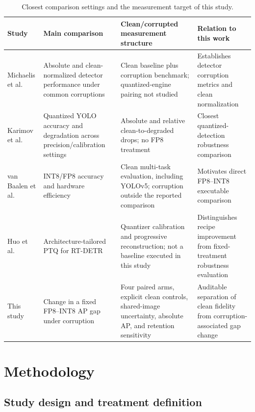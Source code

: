 \documentclass[a4paper,fleqn]{cas-dc}
\begin{document}
\begin{table}[t]
\centering\small
\caption{Closest comparison settings and the measurement target of this study.}
\label{tab:prior-art}
\setlength{\tabcolsep}{4pt}
\renewcommand{\arraystretch}{1.16}
\begin{tabular}{Y{2.3cm}Y{4.0cm}Y{4.0cm}Y{3.9cm}}
\toprule
Study & Main comparison & Clean/corrupted measurement structure & Relation to this work\\
\midrule
Michaelis et al.~\citep{michaelis2019detectorrobustness} & Absolute and clean-normalized detector performance under common corruptions & Clean baseline plus corruption benchmark; quantized-engine pairing not studied & Establishes detector corruption metrics and clean normalization\\
Karimov et al.~\citep{karimov2025robustness} & Quantized YOLO accuracy and degradation across precision/calibration settings & Absolute and relative clean-to-degraded drops; no FP8 treatment & Closest quantized-detection robustness comparison\\
van Baalen et al.~\citep{vanbaalen2023fp8int8} & INT8/FP8 accuracy and hardware efficiency & Clean multi-task evaluation, including YOLOv5; corruption outside the reported comparison & Motivates direct FP8--INT8 executable comparison\\
Huo et al.~\citep{huo2026qrt} & Architecture-tailored PTQ for RT-DETR & Quantizer calibration and progressive reconstruction; not a baseline executed in this study & Distinguishes recipe improvement from fixed-treatment robustness evaluation\\
This study & Change in a fixed FP8--INT8 AP gap under corruption & Four paired arms, explicit clean controls, shared-image uncertainty, absolute AP, and retention sensitivity & Auditable separation of clean fidelity from corruption-associated gap change\\
\bottomrule
\end{tabular}
\end{table}

\section{Methodology}
\label{sec:methods}

\subsection{Study design and treatment definition}
\label{sec:study-design}
\end{document}
